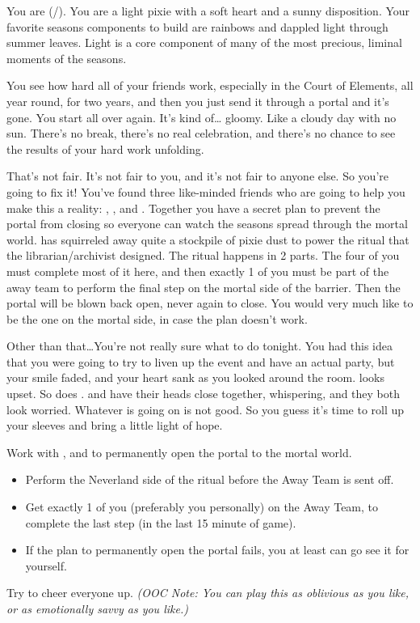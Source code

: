 \documentclass[char]{PP}
\begin{document}
\name{\cESweet{}}

You are \cESweet{} (\cESweet{\They}/\cESweet{\Them}). You are a light pixie with a soft heart and a sunny disposition. Your favorite seasons components to build are rainbows and dappled light through summer leaves. Light is a core component of many of the most precious, liminal moments of the seasons.

You see how hard all of your friends work, especially in the Court of Elements, all year round, for two years, and then you just send it through a portal and it’s gone. You start all over again. It’s kind of… gloomy. Like a cloudy day with no sun. There’s no break, there’s no real celebration, and there’s no chance to see the results of your hard work unfolding.

That’s not fair. It’s not fair to you, and it’s not fair to anyone else. So you’re going to fix it! You’ve found three like-minded friends who are going to help you make this a reality: \cSLibrarian{}, \cFHeart{}, and \cMIron{}. Together you have a secret plan to prevent the portal from closing so everyone can watch the seasons spread through the mortal world. \cMIron{} has squirreled away quite a stockpile of pixie dust to power the ritual that the librarian/archivist designed. The ritual happens in 2 parts. The four of you must complete most of it here, and then exactly 1 of you must be part of the away team to perform the final step on the mortal side of the barrier. Then the portal will be blown back open, never again to close. You would very much like to be the one on the mortal side, in case the plan doesn’t work.

Other than that\ldots You’re not really sure what to do tonight. You had this idea that you were going to try to liven up the event and have an actual party, but your smile faded, and your heart sank as you looked around the room. \cFButterfly{} looks upset. So does \cMHead{}. \cSHead{} and \cEHead{} have their heads close together, whispering, and they both look worried. Whatever is going on is not good. So you guess it’s time to roll up your sleeves and bring a little light of hope.

\begin{itemz}
	\item Work with \cSLibrarian{}, \cFHeart{} and \cMIron{} to permanently open the portal to the mortal world.
	\begin{itemize}
		\item Perform the Neverland side of the ritual before the Away Team is sent off.
		\item Get exactly 1 of you (preferably you personally) on the Away Team, to complete the last step (in the last 15 minute of game).
		\item If the plan to permanently open the portal fails, you at least can go see it for yourself.
	\end{itemize}
	\item Try to cheer everyone up. \textit{(OOC Note: You can play this as oblivious as you like, or as emotionally savvy as you like.)}
\end{itemz}
\end{document}
